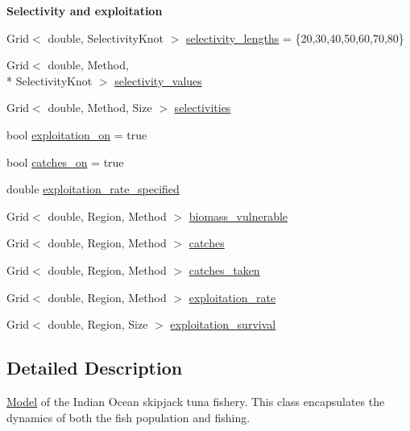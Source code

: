 \begin{Indent}{\bf Selectivity and exploitation}\par
\begin{DoxyCompactItemize}
\item 
Grid$<$ double, Selectivity\-Knot $>$ \hyperlink{classIOSKJ_1_1Model_a16348f2bb00494e5525d9eeef50e6fbe}{selectivity\-\_\-lengths} = \{20,30,40,50,60,70,80\}
\item 
Grid$<$ double, Method, \\*
Selectivity\-Knot $>$ \hyperlink{classIOSKJ_1_1Model_a325ae5d4dfdf49ec5eb21dd01f703c7c}{selectivity\-\_\-values}
\item 
Grid$<$ double, Method, Size $>$ \hyperlink{classIOSKJ_1_1Model_a520b30af1796af1b4c1322d28291012c}{selectivities}
\item 
bool \hyperlink{classIOSKJ_1_1Model_ab9afc5bae0ac8e16817802e54bdfa60d}{exploitation\-\_\-on} = true
\item 
bool \hyperlink{classIOSKJ_1_1Model_a08d60d30e87f40f9b2eb4aa9b2d44490}{catches\-\_\-on} = true
\item 
double \hyperlink{classIOSKJ_1_1Model_a015194a0ad0bfe298215636d04cdb7f0}{exploitation\-\_\-rate\-\_\-specified}
\item 
Grid$<$ double, Region, Method $>$ \hyperlink{classIOSKJ_1_1Model_a045137b448927ff2b8d1269d6bb83630}{biomass\-\_\-vulnerable}
\item 
Grid$<$ double, Region, Method $>$ \hyperlink{classIOSKJ_1_1Model_aa37aad25cd7cc8a4efc5fb6de72bd7e3}{catches}
\item 
Grid$<$ double, Region, Method $>$ \hyperlink{classIOSKJ_1_1Model_a2d473830abac1f8f4367621a33deb9ca}{catches\-\_\-taken}
\item 
Grid$<$ double, Region, Method $>$ \hyperlink{classIOSKJ_1_1Model_a50a15fee3ebbd10f3932e6c48f33857e}{exploitation\-\_\-rate}
\item 
Grid$<$ double, Region, Size $>$ \hyperlink{classIOSKJ_1_1Model_ab84ee0b2d5df659d730fe4c3141a7f5f}{exploitation\-\_\-survival}
\end{DoxyCompactItemize}
\end{Indent}


\subsection{Detailed Description}
\hyperlink{classIOSKJ_1_1Model}{Model} of the Indian Ocean skipjack tuna fishery. This class encapsulates the dynamics of both the fish population and fishing.

